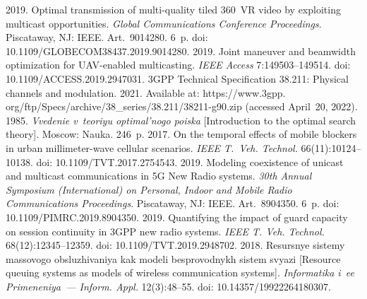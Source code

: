 \begin{multicols}{2}
{{\begin{thebibliography}{99}
   2019. Optimal transmission of multi-quality tiled 
360~VR video by exploiting multicast opportunities. \textit{Global Communications Conference 
Proceedings}. Piscataway, NJ: IEEE. Art.~9014280. 6~p. doi: 10.1109/\linebreak GLOBECOM38437.2019.9014280.
   2019. Joint maneuver and beamwidth 
optimization for UAV-enabled multicasting. \textit{IEEE Access} 7:149503--149514. doi: 
10.1109/\linebreak ACCESS.2019.2947031.
  3GPP Technical Specification 38.211: Physical channels and modulation. 2021. Available at: {\sf 
https://www.3gpp. org/ftp/Specs/archive/38\_series/38.211/38211-g90.zip} (accessed April~20, 
2022).
   1985. \textit{Vvedenie v~teoriyu optimal'nogo poiska} [Introduction to the 
optimal search theory]. Moscow: Nauka. 246~p.
   2017. On the 
temporal effects of mobile blockers in urban millimeter-wave cellular scenarios. \textit{IEEE 
T.~Veh. Technol.} 66(11):10124--10138. doi: 10.1109/TVT.2017.2754543.
   2019. Modeling coexistence of unicast and multicast communications in 5G New 
Radio systems. \textit{30th Annual  Symposium (International) on Personal, Indoor and Mobile 
Radio Communications Proceedings}. Piscataway, NJ:  IEEE. Art.~8904350. 6~p. doi: 10.1109/PIMRC.2019.8904350.
   2019. Quantifying the impact of guard capacity on session continuity in 3GPP new 
radio systems. \textit{IEEE T. Veh. Technol.} 68(12):12345--12359. doi: 
10.1109/TVT.2019.2948702.
   2018. 
Resursnye sistemy massovogo obsluzhivaniya kak modeli besprovodnykh sistem svyazi [Resource 
queuing systems as models of wireless communication systems]. \textit{Informatika i~ee 
Primeneniya~--- Inform. Appl.} 12(3):48--55. doi: 10.14357/19922264180307. 

\end{thebibliography}

 }
 }

\end{multicols}

